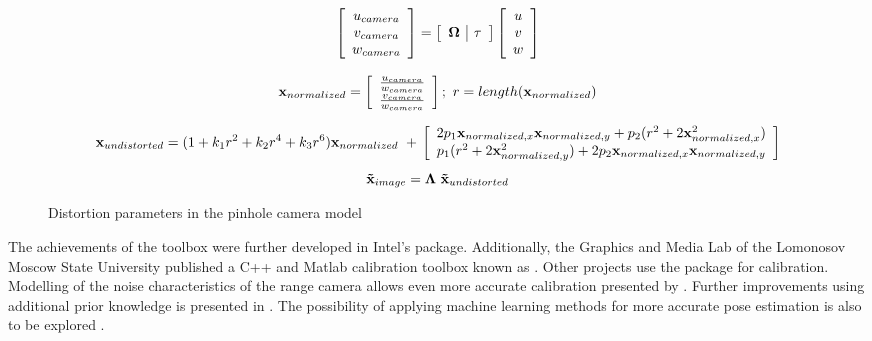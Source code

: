 \documentclass{ucl_thesis}
\begin{document}
\begin{figure}[h!]
    \begin{equation*}
	\left[\begin{array}{c}
		u_{camera} \\
		v_{camera} \\
		w_{camera} \\
	\end{array} \right]
	=
    	\left[\begin{array}{c|c}
	    	{\bf \Omega} & {\bf \tau}
	\end{array} \right]
	\left[\begin{array}{c}
	    u \\
	    	v \\
	    w \\
	\end{array} \right]
    \end{equation*}
    
    \begin{equation*}
	{\bf x}_{normalized} = 
 	\left[\begin{array}{c}
	    \frac{ u_{camera} }{ w_{camera} } \\
	    \frac{ v_{camera} }{ w_{camera} } \\
	\end{array} \right]; 
	~r = length(	{\bf x}_{normalized} )
    \end{equation*}

    \begin{equation*}
	{\bf x}_{undistorted}
	=
	(1 + k_1 r^2 + k_2 r^4 + k_3 r^6 ) {\bf x}_{normalized} 
	~+~\\ 
	\left[\begin{array}{c}
	    2 p_1 {\bf x}_{normalized,x} {\bf x}_{normalized,y} + p_2 ( r^2 + 2{\bf x}_{normalized,x}^2) \\
	    p_1(r^2+2{\bf x}_{normalized,y}^2) + 2 p_2 {\bf x}_{normalized,x} {\bf x}_{normalized,y}\\
	\end{array} \right]
	\end{equation*}
    \begin{equation*}
		{\bf \tilde{x}}_{image} = {\bf\Lambda} ~ {\bf \tilde{x}}_{undistorted}
    \end{equation*}
    
    \caption{Distortion parameters in the pinhole camera model}
    \label{eq:distortion}
\end{figure}

The achievements of the toolbox were further developed in Intel's \citep{calibration_opencv} package. Additionally, the Graphics and Media Lab of the Lomonosov Moscow State University published a C++ and Matlab calibration toolbox known as \citep{calibration_gml}. Other projects use the \citep{calibration_rgbdemo} package for calibration. Modelling of the noise characteristics of the range camera allows even more accurate calibration presented by \citep{calibration_herrera}. Further improvements using additional prior knowledge is presented in \citep{Herrera:LearnedJointMRF}. The possibility of applying machine learning methods for more accurate pose estimation is also to be explored \citep{malisiewicz-iccv11}.
\end{document}
